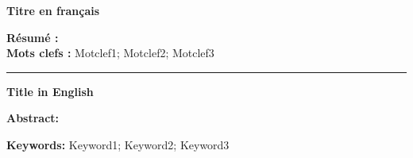 \newpage
\null\vfill
{\fontsize{7.5}{8}\selectfont
\begin{center}
\textbf{Titre en français} \\
\end{center} 
\textbf{Résumé :}
\lipsum[1-4] \\

\textbf{Mots clefs :}
Motclef1; Motclef2; Motclef3 \vspace*{\baselineskip}
\newline\noindent\rule{\textwidth}{0.7pt}

\begin{center}
\textbf{Title in English} \\
\end{center} 
\textbf{Abstract:}
\lipsum[1-4]

\textbf{Keywords:}
Keyword1; Keyword2; Keyword3

}
\vfill\null